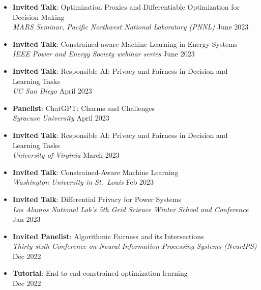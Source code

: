 \begin{itemize}
  \item {\bf Invited Talk}: {Optimization Proxies and Differentiable Optimization for Decision Making}\\
  {\em  MARS Seminar, Pacific Northwest National Laboratory (PNNL)}
  \hfill{June 2023}

  \item {\bf Invited Talk}: {Constrained-aware Machine Learning in Energy Systems}\\
  {\em  IEEE Power and Energy Society webinar series}
  \hfill{June 2023}

  \item {\bf Invited Talk}: {Responsible AI: Privacy and Fairness in Decision and Learning Tasks}\\
  {\em  UC San Diego}
  \hfill{April 2023}

  \item {\bf Panelist}: {ChatGPT: Charms and Challenges}\\
  {\em  Syracuse University}
  \hfill{April 2023}

  \item {\bf Invited Talk}: {Responsible AI: Privacy and Fairness in Decision and Learning Tasks}\\
  {\em  University of Virginia}
  \hfill{March 2023}

  \item {\bf Invited Talk}: {Constrained-Aware Machine Learning}\\
  {\em  Washington University in St.~Louis}
  \hfill{Feb 2023}

  \item {\bf Invited Talk}: {Differential Privacy for Power Systems}\\
  {\em  Los Alamos National Lab's 5th Grid Science Winter School and Conference}
  \hfill{Jan 2023}

  \item {\bf Invited Panelist}: {Algorithmic Fairness and its Intersections}\\
  {\em Thirty-sixth Conference on Neural Information Processing Systems (NeurIPS)}
  \hfill{Dec 2022}

  \item {\bf Tutorial}: {End-to-end constrained optimization learning}\\
  \hfill{Dec 2022}


\end{itemize}
